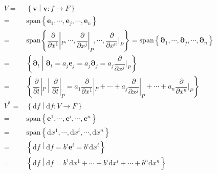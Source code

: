 \documentclass[
]{book}
\theoremstyle{definition}
\theoremstyle{definition}
\theoremstyle{definition}
\theoremstyle{definition}
\theoremstyle{remark}
\begin{document}
\[
\begin{aligned}
V= & \left\{ \boldsymbol{v}\middle|\boldsymbol{v}:f\rightarrow F\right\} \\
= & \mathrm{span}\left\{ \boldsymbol{e}_{{\scriptscriptstyle 1}},\cdots,\boldsymbol{e}_{{\scriptscriptstyle j}},\cdots,\boldsymbol{e}_{{\scriptscriptstyle n}}\right\} \\
= & \mathrm{span}\left\{ \dfrac{\partial}{\partial x^{{\scriptscriptstyle 1}}}|_{{\scriptscriptstyle P}},\cdots,\dfrac{\partial}{\partial x^{{\scriptscriptstyle j}}}|_{{\scriptscriptstyle P}},\cdots,\dfrac{\partial}{\partial x^{{\scriptscriptstyle n}}}|_{{\scriptscriptstyle P}}\right\} =\mathrm{span}\left\{ \boldsymbol{\partial}_{{\scriptscriptstyle 1}},\cdots,\boldsymbol{\partial}_{{\scriptscriptstyle j}},\cdots,\boldsymbol{\partial}_{{\scriptscriptstyle n}}\right\} \\
= & \left\{ \boldsymbol{\partial}_{{\scriptscriptstyle t}}\middle|\boldsymbol{\partial}_{{\scriptscriptstyle t}}=a_{{\scriptscriptstyle j}}\boldsymbol{e}_{{\scriptscriptstyle j}}=a_{{\scriptscriptstyle j}}\boldsymbol{\partial}_{{\scriptscriptstyle j}}=a_{{\scriptscriptstyle j}}\dfrac{\partial}{\partial x^{{\scriptscriptstyle j}}}|_{{\scriptscriptstyle P}}\right\} \\
= & \left\{ \dfrac{\partial}{\partial t}|_{{\scriptscriptstyle P}}\middle|\dfrac{\partial}{\partial t}|_{{\scriptscriptstyle P}}=a_{{\scriptscriptstyle 1}}\dfrac{\partial}{\partial x^{{\scriptscriptstyle 1}}}|_{{\scriptscriptstyle P}}+\cdots+a_{{\scriptscriptstyle j}}\dfrac{\partial}{\partial x^{{\scriptscriptstyle j}}}|_{{\scriptscriptstyle P}}+\cdots+a_{{\scriptscriptstyle n}}\dfrac{\partial}{\partial x^{{\scriptscriptstyle n}}}|_{{\scriptscriptstyle P}}\right\} \\
V^{*}= & \left\{ \mathrm{d}f\middle|\mathrm{d}f:V\rightarrow F\right\} \\
= & \mathrm{span}\left\{ \boldsymbol{e}^{{\scriptscriptstyle 1}},\cdots,\boldsymbol{e}^{{\scriptscriptstyle i}},\cdots,\boldsymbol{e}^{{\scriptscriptstyle n}}\right\} \\
= & \mathrm{span}\left\{ \mathrm{d}x^{{\scriptscriptstyle 1}},\cdots,\mathrm{d}x^{{\scriptscriptstyle i}},\cdots,\mathrm{d}x^{{\scriptscriptstyle n}}\right\} \\
= & \left\{ \mathrm{d}f\middle|\mathrm{d}f=b^{{\scriptscriptstyle i}}\boldsymbol{e}^{{\scriptscriptstyle i}}=b^{{\scriptscriptstyle i}}\mathrm{d}x^{{\scriptscriptstyle i}}\right\} \\
= & \left\{ \mathrm{d}f\middle|\mathrm{d}f=b^{{\scriptscriptstyle 1}}\mathrm{d}x^{{\scriptscriptstyle 1}}+\cdots+b^{{\scriptscriptstyle i}}\mathrm{d}x^{{\scriptscriptstyle i}}+\cdots+b^{{\scriptscriptstyle n}}\mathrm{d}x^{{\scriptscriptstyle n}}\right\} 
\end{aligned}
\]
\end{document}
